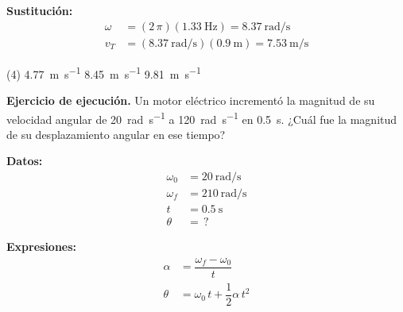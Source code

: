 \documentclass[12pt, letter]{exam}
\begin{document}
\begin{questions}
    \vspace*{0.3cm}
    \textbf{Sustitución:}
    \begin{align*}
    \omega &= (2 \, \pi) \left( \SI{1.33}{\hertz} \right) = \SI[per-mode=fraction]{8.37}{\radian\per\second} \\[0.5em]
    v_{T} &= \left( \SI[per-mode=fraction]{8.37}{\radian\per\second} \right) \left( \SI{0.9}{\meter} \right) = \SI[per-mode=fraction]{7.53}{\meter\per\second}
    \end{align*}
    \begin{tasks}(4)
        \task \SI{4.77}{\meter\per\second}
        \task {}
        \task \SI{8.45}{\meter\per\second}
        \task \SI{9.81}{\meter\per\second}
    \end{tasks}

    \newpage
    
    \setcounter{question}{12} \question \textbf{Ejercicio de ejecución.} Un motor eléctrico incrementó la magnitud de su velocidad angular de \SI{20}{\radian\per\second} a \SI{120}{\radian\per\second} en \SI{0.5}{\second}. ¿Cuál fue la magnitud de su desplazamiento angular en ese tiempo?

    \vspace*{0.3cm}
    \begin{minipage}[t]{0.4\linewidth}
    \textbf{Datos:}
    \begin{align*}
    \omega_{0} &= \SI{20}{\radian\per\second} \\
    \omega_{f} &= \SI{210}{\radian\per\second} \\
    t &= \SI{0.5}{\second} \\
    \theta &= \, ?
    \end{align*}
    \end{minipage}
    \hspace{1cm}
    \begin{minipage}[t]{0.4\linewidth}
    \textbf{Expresiones:}
    \begin{align*}
    \alpha &= \dfrac{\omega_{f} - \omega_{0}}{t} \\[0.5em]
    \theta &= \omega_{0} \, t +\dfrac{1}{2} \alpha \, t^{2}
    \end{align*}
    \end{minipage}


\end{questions}
\end{document}

